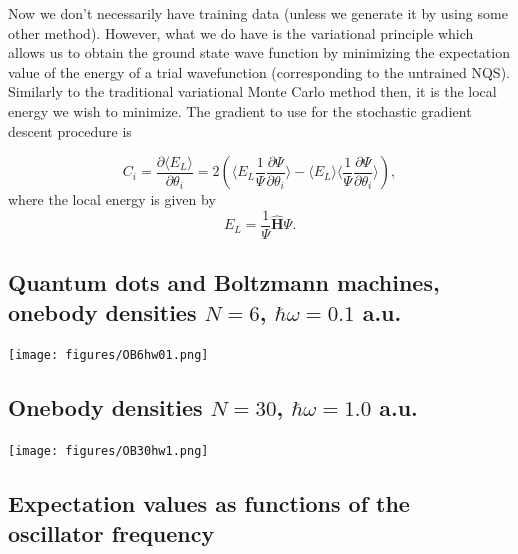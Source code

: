 \documentclass[%
oneside,                 %
final,                   %
10pt]{article}
\begin{document}
Now we don't necessarily have training data (unless we generate it by
using some other method). However, what we do have is the variational
principle which allows us to obtain the ground state wave function by
minimizing the expectation value of the energy of a trial wavefunction
(corresponding to the untrained NQS). Similarly to the traditional
variational Monte Carlo method then, it is the local energy we wish to
minimize. The gradient to use for the stochastic gradient descent
procedure is

\[
	C_i = \frac{\partial \langle E_L \rangle}{\partial \theta_i}
	= 2(\langle E_L \frac{1}{\Psi}\frac{\partial \Psi}{\partial \theta_i} \rangle - \langle E_L \rangle \langle \frac{1}{\Psi}\frac{\partial \Psi}{\partial \theta_i} \rangle ),
\]
where the local energy is given by
\[
	E_L = \frac{1}{\Psi} \hat{\bm{H}} \Psi.
\]

\subsection{Quantum dots and Boltzmann machines, onebody densities $N=6$, $\hbar\omega=0.1$ a.u.}

\begin{block}{}

\vspace{6mm}

\centerline{\texttt{[image: figures/OB6hw01.png]}}

\vspace{6mm}

\end{block}

\subsection{Onebody densities $N=30$, $\hbar\omega=1.0$ a.u.}
\begin{block}{}

\vspace{6mm}

\centerline{\texttt{[image: figures/OB30hw1.png]}}

\vspace{6mm}

\end{block}

\subsection{Expectation values as functions of the oscillator frequency}
\end{document}
